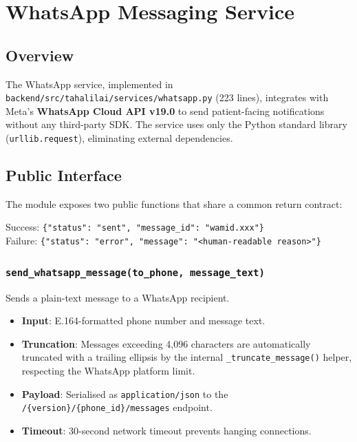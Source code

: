 \documentclass[12pt, a4paper]{article}
\newcommand{\file}[1]{\texttt{\color{accent}#1}}
\newcommand{\func}[1]{\texttt{\color{danger}#1}}
\begin{document}
\section{WhatsApp Messaging Service}

\subsection{Overview}

The WhatsApp service, implemented in \file{backend/src/tahalilai/services/whatsapp.py}
(223 lines), integrates with Meta's \textbf{WhatsApp Cloud API v19.0} to send
patient-facing notifications without any third-party SDK.
The service uses only the Python standard library (\texttt{urllib.request}),
eliminating external dependencies.

\subsection{Public Interface}

The module exposes two public functions that share a common return contract:

\begin{infobox}[title={Return Contract}]
  Success: \quad \texttt{\{"status": "sent", "message\_id": "wamid.xxx"\}} \\
  Failure: \quad \texttt{\{"status": "error", "message": "<human-readable reason>"\}}
\end{infobox}

\subsubsection{\func{send\_whatsapp\_message(to\_phone, message\_text)}}

Sends a plain-text message to a WhatsApp recipient.

\begin{itemize}[leftmargin=*, itemsep=3pt]
  \item \textbf{Input}: E.164-formatted phone number and message text.
  \item \textbf{Truncation}: Messages exceeding 4,096 characters are automatically
        truncated with a trailing ellipsis by the internal \func{\_truncate\_message()}
        helper, respecting the WhatsApp platform limit.
  \item \textbf{Payload}: Serialised as \texttt{application/json} to the
        \texttt{/\{version\}/\{phone\_id\}/messages} endpoint.
  \item \textbf{Timeout}: 30-second network timeout prevents hanging connections.
\end{itemize}
\end{document}

